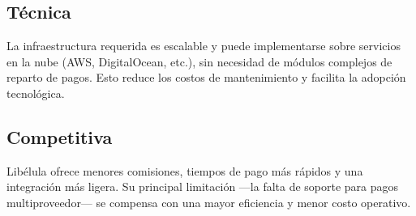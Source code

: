     \subsection{Técnica}
    	La infraestructura requerida es escalable y puede implementarse sobre servicios en la nube (AWS, DigitalOcean, etc.), 
		sin necesidad de módulos complejos de reparto de pagos. Esto reduce los costos de mantenimiento y facilita la 
		adopción tecnológica.\par
    
    \subsection{Competitiva}
    	Libélula ofrece menores comisiones, tiempos de pago más rápidos y una integración más ligera. Su principal 
		limitación ---la falta de soporte para pagos multiproveedor--- se compensa con una mayor eficiencia y menor costo 
		operativo.\par